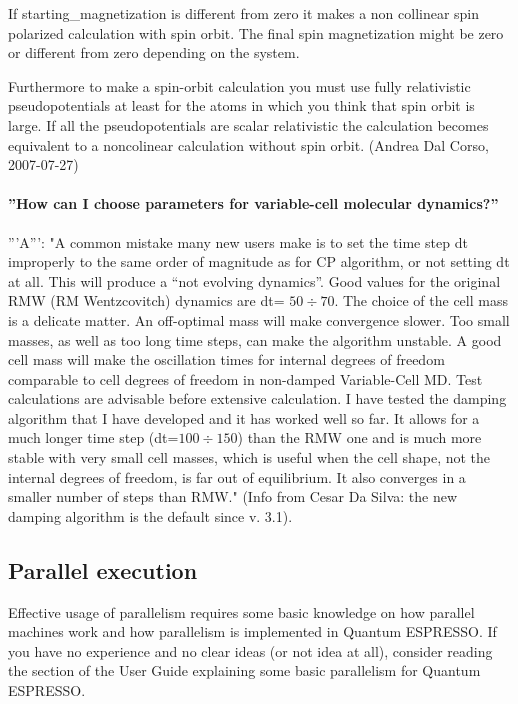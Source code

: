 \documentclass[12pt,a4paper]{article}
\def\qe{{\sc Quantum ESPRESSO}}
\begin{document}
If starting\_magnetization is different from zero it makes a non
collinear spin polarized calculation with spin orbit. The final spin
magnetization might be zero or different from zero depending on the
system. 

Furthermore to make a spin-orbit calculation you must use fully
relativistic pseudopotentials at least for the atoms in which you
think that spin orbit is large. If all the pseudopotentials are scalar
relativistic the calculation becomes equivalent to a noncolinear
calculation without spin orbit. (Andrea Dal Corso, 2007-07-27)

\paragraph{ ''How can I choose parameters for variable-cell molecular
  dynamics?''} 
'''A''': "A common mistake many new users make is to set the time step dt
improperly to the same order of magnitude as for CP algorithm, or
not setting dt at all. This will produce a ``not evolving dynamics''.
Good values for the original RMW (RM Wentzcovitch) dynamics are 
dt= $50 \div 70$. The choice of the cell mass is a delicate matter. An
off-optimal mass will make convergence slower. Too small masses, as
well as too long time steps, can make the algorithm unstable. A good
cell mass will make the oscillation times for internal degrees of
freedom comparable to cell degrees of freedom in non-damped
Variable-Cell MD. Test calculations are advisable before extensive
calculation. I have tested the damping algorithm that I have developed
and it has worked well so far. It allows for a much longer time step
(dt=$100 \div 150$) than the RMW one and is much more stable with very
small cell masses, which is useful when the cell shape, not the
internal degrees of freedom, is far out of equilibrium. It also
converges in a smaller number of steps than RMW." (Info from Cesar Da
Silva: the new damping algorithm is the default since v. 3.1).

\subsection{Parallel execution}

Effective usage of parallelism requires some basic knowledge on how
parallel machines work and how parallelism is implemented in
\qe. If you have no experience and no clear ideas (or not
idea at all), consider reading the section of the User Guide
explaining some basic parallelism for \qe.
\end{document}
